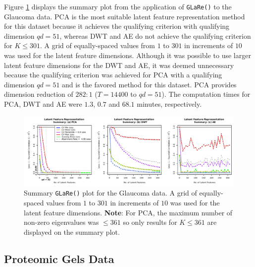 Figure \ref{fig:eye-results} displays the summary plot from the application of \texttt{GLaRe()} to the Glaucoma data.
PCA is the most suitable latent feature representation method for this dataset because it achieves the qualifying criterion with qualifying dimension $qd=51$, whereas DWT and AE do not achieve the qualifying criterion for $K \leq 301$.
A grid of equally-spaced values from $1$ to $301$ in increments of $10$ was used for the latent feature dimensions.
Although it was possible to use larger latent feature dimensions for the DWT and AE, it was deemed unnecessary because the qualifying criterion was achieved for PCA with a qualifying dimension $qd=51$ and is the favored method for this dataset.
PCA provides dimension reduction of $282:1$ ($T = 14400$ to $qd = 51$).
The computation times for PCA, DWT and AE were $1.3$, $0.7$ and $68.1$ minutes, respectively.


\begin{figure}
    \centering
    \includegraphics[width=1\textwidth]{figures/eye-results.pdf}
    \caption{Summary \texttt{GLaRe()} plot for the Glaucoma data. A grid of equally-spaced values from $1$ to $301$ in increments of $10$ was used for the latent feature dimensions. \textbf{Note}: For PCA, the maximum number of non-zero eigenvalues was $\leq361$ so only results for $K \leq 361$ are displayed on the summary plot.}
    \label{fig:eye-results}
\end{figure}

\subsection{Proteomic Gels Data}

